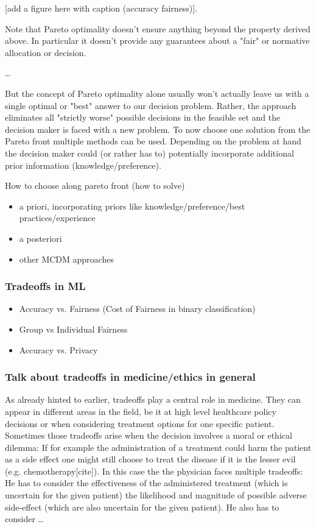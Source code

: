 	[add a figure here with caption (accuracy fairness)].

	Note that Pareto optimality doesn't ensure anything beyond the property derived above.
	In particular it doesn't provide any guarantees about a "fair" or normative allocation or decision.

	\dots

	But the concept of Pareto optimality alone usually won't actually leave us with a single optimal or "best" answer to our decision problem.
	Rather, the approach eliminates all "strictly worse" possible decisions in the feasible set and the decision maker is faced with a new problem.
	To now choose one solution from the Pareto front multiple methods can be used.
	Depending on the problem at hand the decision maker could (or rather has to) potentially incorporate additional prior information (knowledge/preference).

	How to choose along pareto front (how to solve)

	\begin{itemize}
	\item a priori, incorporating priors like knowledge/preference/best practices/experience
	\item a posteriori
	\item other MCDM approaches
	\end{itemize}


	\subsubsection{Tradeoffs in ML}
	\begin{itemize}
		\item Accuracy vs. Fairness (Cost of Fairness in binary classification) 
		\item Group vs Individual Fairness
		\item Accuracy vs. Privacy
	\end{itemize}


	\subsubsection{Talk about tradeoffs in medicine/ethics in general}
	As already hinted to earlier, tradeoffs play a central role in medicine.
	They can appear in different areas in the field, be it at high level healthcare policy decisions or when considering treatment options for one specific patient.
	Sometimes those tradeoffs arise when the decision involves a moral or ethical dilemma:
	If for example the administration of a treatment could harm the patient as a side effect one might still choose to treat the disease if it is the lesser evil (e.g. chemotherapy[cite]).
	In this case the the physician faces multiple tradeoffs:
	He has to consider the effectiveness of the administered treatment (which is uncertain for the given patient) the likelihood and magnitude of possible adverse side-effect (which are also uncertain for the given patient).
	He also has to consider \dots
	
